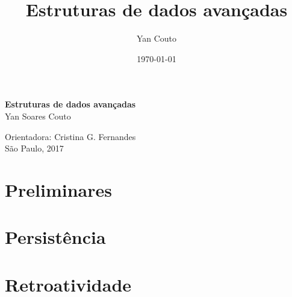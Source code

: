 \documentclass[11pt,oneside,a4paper, openany]{book}
\title{Estruturas de dados avançadas}
\author{Yan Couto}
\date{\today}
\begin{document}
\frontmatter

\thispagestyle{empty}
\begin{center}
	\vspace*{2.3cm}
	\textbf{\huge{Estruturas de dados avançadas}}\\

	\vspace*{1cm}
	\Large{Yan Soares Couto}

	\vskip 1.8cm
	Orientadora: Cristina G. Fernandes\\

	\vspace{\fill}
	\normalsize{São Paulo, 2017}
\end{center}

\setcounter{tocdepth}{1}

\begingroup
\let\cleardoublepage\clearpage
\tableofcontents
\endgroup

\mainmatter
{}

\part{Preliminares}


\part{Persistência}











\part{Retroatividade}






\end{document}
